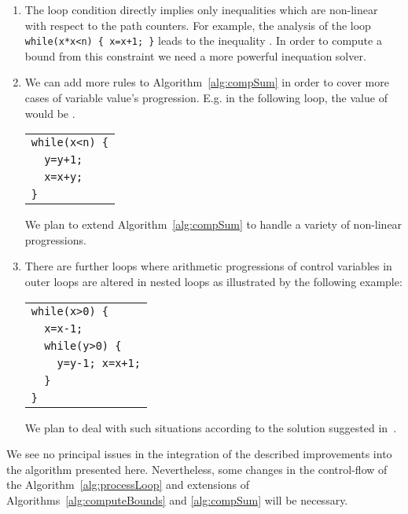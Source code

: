 \documentclass[10pt,a4paper]{article}
\begin{document}
\begin{enumerate}
\item The loop condition directly implies only inequalities which are non-linear
with respect to the path counters. For example, the analysis of the
  loop \texttt{while(x*x<n)\,\{\,x=x+1;\,\}}
leads to the inequality . In order to
 compute a bound from this constraint we need a more powerful inequation
 solver.

\item We can add more rules to Algorithm~\ref{alg:compSum} in order to 
  cover more cases of variable value's progression. E.g. in the following loop, the value of
   would be .


  \begin{center}
  \begin{tabular}{l}
    \texttt{while(x<n)~\{}\\
    \texttt{~~y=y+1;}\\
    \texttt{~~x=x+y;}\\
    \texttt{\}}\\
  \end{tabular} 
  \end{center} 
  We plan to extend Algorithm~\ref{alg:compSum} to handle a variety of
  non-linear progressions.

\item There are further loops where arithmetic progressions of control
  variables in outer loops are altered in nested loops as illustrated
  by the following example:
  \begin{center}
  \begin{tabular}{l}
    \texttt{while(x>0)~\{}\\
    \texttt{~~x=x-1;}\\
    \texttt{~~while(y>0)~\{}\\
    \texttt{~~~~y=y-1;~x=x+1;}\\
    \texttt{~~\}}\\
    \texttt{\}}
  \end{tabular}
  \end{center}
We plan to deal with such situations according to the solution
  suggested in~\cite{Loopus2014}.
\end{enumerate}
We see no principal issues in the integration of the described
improvements into the algorithm presented here. Nevertheless, some changes in
the control-flow of the Algorithm~\ref{alg:processLoop} and extensions of
Algorithms~\ref{alg:computeBounds} and \ref{alg:compSum} will be necessary.
\end{document}
